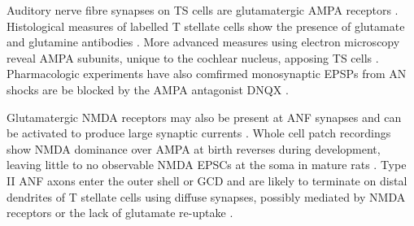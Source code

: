 
Auditory nerve fibre synapses on TS cells are glutamatergic AMPA receptors
\citep{FerragamoGoldingEtAl:1998a,WentholdHunterEtAl:1993}.  Histological measures of
labelled T stellate cells show the presence of glutamate and glutamine antibodies
\citep{HackneyOsenEtAl:1990,WentholdHunterEtAl:1993}.  More advanced measures using
electron microscopy reveal AMPA subunits, unique to the cochlear nucleus, apposing TS
cells \citep{WangWentholdEtAl:1998}.  Pharmacologic experiments have also comfirmed
monosynaptic EPSPs from AN shocks are be blocked by the AMPA antagonist DNQX
\citep{FerragamoGoldingEtAl:1998a}.  

Glutamatergic NMDA receptors may also be present at ANF synapses \citep[mice][]{FerragamoGoldingEtAl:1998a} and can be activated to produce large synaptic currents \citep{CaoOertel:2010}.
Whole cell patch recordings show NMDA dominance over AMPA at birth reverses during development, leaving little to no observable NMDA EPSCs at the soma
in mature rats \citep{BellinghamLimEtAl:1998}.
Type II ANF axons enter the outer shell or GCD and are likely to terminate on distal
dendrites of T stellate cells using diffuse synapses, possibly mediated by NMDA
receptors or the lack of glutamate re-uptake
\citep{BensonBrown:2004,Ryugo:2008,RyugoHaenggeliEtAl:2003,RyugoParks:2003}.







